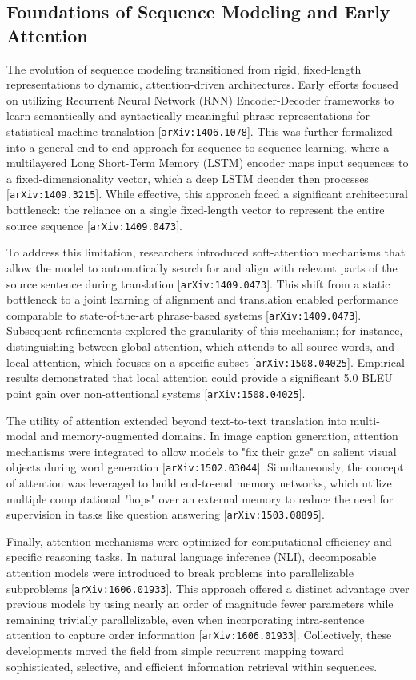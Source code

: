 \documentclass[11pt]{article}
\begin{document}
\subsection{Foundations of Sequence Modeling and Early Attention}

The evolution of sequence modeling transitioned from rigid, fixed-length representations to dynamic, attention-driven architectures. Early efforts focused on utilizing Recurrent Neural Network (RNN) Encoder-Decoder frameworks to learn semantically and syntactically meaningful phrase representations for statistical machine translation [\texttt{arXiv:1406.1078}]. This was further formalized into a general end-to-end approach for sequence-to-sequence learning, where a multilayered Long Short-Term Memory (LSTM) encoder maps input sequences to a fixed-dimensionality vector, which a deep LSTM decoder then processes [\texttt{arXiv:1409.3215}]. While effective, this approach faced a significant architectural bottleneck: the reliance on a single fixed-length vector to represent the entire source sequence [\texttt{arXiv:1409.0473}].

To address this limitation, researchers introduced soft-attention mechanisms that allow the model to automatically search for and align with relevant parts of the source sentence during translation [\texttt{arXiv:1409.0473}]. This shift from a static bottleneck to a joint learning of alignment and translation enabled performance comparable to state-of-the-art phrase-based systems [\texttt{arXiv:1409.0473}]. Subsequent refinements explored the granularity of this mechanism; for instance, distinguishing between global attention, which attends to all source words, and local attention, which focuses on a specific subset [\texttt{arXiv:1508.04025}]. Empirical results demonstrated that local attention could provide a significant 5.0 BLEU point gain over non-attentional systems [\texttt{arXiv:1508.04025}].

The utility of attention extended beyond text-to-text translation into multi-modal and memory-augmented domains. In image caption generation, attention mechanisms were integrated to allow models to "fix their gaze" on salient visual objects during word generation [\texttt{arXiv:1502.03044}]. Simultaneously, the concept of attention was leveraged to build end-to-end memory networks, which utilize multiple computational "hops" over an external memory to reduce the need for supervision in tasks like question answering [\texttt{arXiv:1503.08895}].

Finally, attention mechanisms were optimized for computational efficiency and specific reasoning tasks. In natural language inference (NLI), decomposable attention models were introduced to break problems into parallelizable subproblems [\texttt{arXiv:1606.01933}]. This approach offered a distinct advantage over previous models by using nearly an order of magnitude fewer parameters while remaining trivially parallelizable, even when incorporating intra-sentence attention to capture order information [\texttt{arXiv:1606.01933}]. Collectively, these developments moved the field from simple recurrent mapping toward sophisticated, selective, and efficient information retrieval within sequences.
\end{document}

